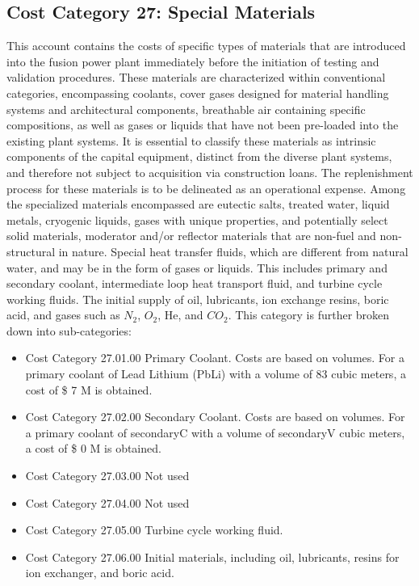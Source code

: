 \subsection{Cost Category 27: Special Materials}

This account contains the costs of specific types of materials that are introduced into the fusion power plant immediately before the initiation of testing and validation procedures. These materials are characterized within conventional categories, encompassing coolants, cover gases designed for material handling systems and architectural components, breathable air containing specific compositions, as well as gases or liquids that have not been pre-loaded into the existing plant systems. It is essential to classify these materials as intrinsic components of the capital equipment, distinct from the diverse plant systems, and therefore not subject to acquisition via construction loans. The replenishment process for  these materials is to be delineated as an operational expense. Among the specialized materials encompassed are eutectic salts, treated water, liquid metals,  cryogenic liquids, gases with unique properties, and potentially select solid materials, moderator and/or reflector materials that are non-fuel and non-structural in nature. Special heat transfer fluids, which are different from natural water, and may be in the form of gases or liquids. This includes primary and secondary coolant, intermediate loop heat transport fluid, and turbine cycle working fluids. The initial supply of oil, lubricants, ion exchange resins, boric acid, and gases such as $N_2$, $O_2$, He, and $CO_2$.
This category is further broken down into sub-categories:

\begin{itemize}
    \item Cost Category 27.01.00 Primary Coolant. Costs are based on volumes. For a primary coolant of Lead Lithium (PbLi) with a volume of 83 cubic meters, a cost of \$ 7 M is obtained.  
    \item Cost Category 27.02.00 Secondary Coolant. Costs are based on volumes. For a primary coolant of secondaryC with a volume of secondaryV cubic meters, a cost of \$ 0 M is obtained.
    \item Cost Category 27.03.00 Not used
    \item Cost Category 27.04.00 Not used
    \item Cost Category 27.05.00 Turbine cycle working fluid.
    \item Cost Category 27.06.00 Initial materials, including oil, lubricants, resins for ion exchanger, and boric acid.
\end{itemize}

